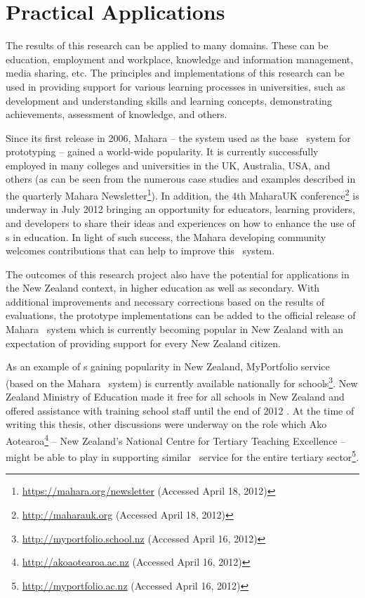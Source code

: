 \section{Practical Applications}

The results of this research can be applied to many domains. These can be
education, employment and workplace, knowledge and information management, media
sharing, etc. The principles and implementations of this research can be used
in providing support for various learning processes in universities, such as
development and understanding skills and learning concepts, demonstrating
achievements, assessment of knowledge, and others.

Since its first release in 2006, Mahara -- the system used as the base
\ep~system for prototyping -- gained a world-wide popularity. It is currently
successfully employed in many colleges and universities in the UK, Australia,
USA, and others (as can be seen from the numerous case studies and examples
described in the quarterly Mahara
Newsletter\footnote{\url{https://mahara.org/newsletter} (Accessed April 18,
2012)}). In addition, the 4th MaharaUK
conference\footnote{\url{http://maharauk.org} (Accessed April 18, 2012)} is
underway in July 2012 bringing an opportunity for educators, learning providers,
and developers to share their ideas and experiences on how to enhance the use of
\ep s in education. In light of such success, the Mahara developing community
welcomes contributions that can help to improve this \ep~system.

The outcomes of this research project also have the potential for applications
in the New Zealand context, in higher education as well as secondary. With
additional improvements and necessary corrections based on the results of
evaluations, the prototype implementations can be added to the official release
of Mahara \ep~system which is currently becoming popular in New Zealand with an
expectation of providing \LLLs support for every New Zealand citizen.

As an example of \ep s gaining popularity in New Zealand, MyPortfolio service
(based on the Mahara \ep~system) is currently available nationally for
schools\footnote{\url{http://myportfolio.school.nz} (Accessed April 16, 2012)}.
New Zealand Ministry of Education made it free for all schools in New Zealand
and offered assistance with training school staff until the end of 2012
\citep{NewZealandMinistryofEducation2012}. At the time of writing this thesis,
other discussions were underway on the role which Ako
Aotearoa\footnote{\url{http://akoaotearoa.ac.nz} (Accessed April 16, 2012)} --
New Zealand's National Centre for Tertiary Teaching Excellence -- might be able
to play in supporting similar \ep~service for the entire tertiary
sector\footnote{\url{http://myportfolio.ac.nz} (Accessed April 16, 2012)}.

